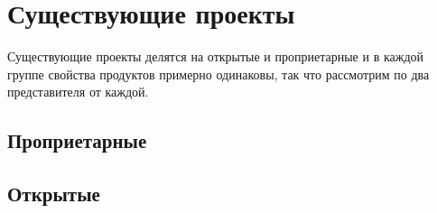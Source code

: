 \section{Существующие проекты}
Существующие проекты делятся на открытые и проприетарные и в каждой группе свойства продуктов примерно одинаковы, так что рассмотрим по два представителя от каждой.

\subsection{Проприетарные}
    
    \pagebreak
    
\subsection{Открытые}
    
    

